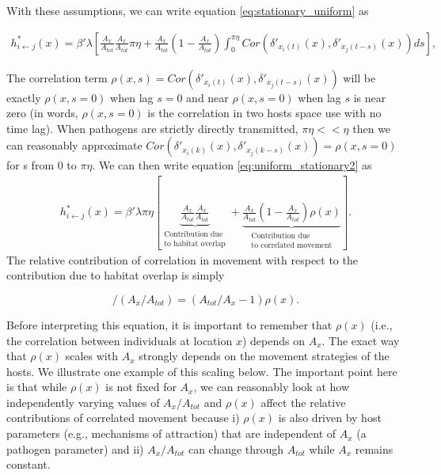 ﻿\documentclass[11pt]{article}
\begin{document}
With these assumptions, we can write equation \ref{eq:stationary_uniform} as

\begin{equation}
    \begin{aligned}
        h^*_{i \leftarrow j}(x) = \beta' \lambda \left[\frac{A_x}{A_{tot}}\frac{A_x}{A_{tot}} \pi \eta + \frac{A_x}{A_{tot}}\left(1 - \frac{A_x}{A_{tot}}\right) \int_{0}^{\pi \eta} Cor(\delta'_{x_i(t)}(x), \delta'_{x_j(t - s)}(x)) ds\right],
    \end{aligned}
    \label{eq:uniform_stationary2}
\end{equation}

The correlation term $\rho(x, s) = Cor(\delta'_{x_i(t)}(x), \delta'_{x_j(t - s)}(x))$ will be exactly $\rho(x, s = 0)$ when lag $s = 0$ and near $\rho(x, s = 0)$ when lag $s$ is near zero (in words, $\rho(x, s = 0)$ is the correlation in two hosts space use with no time lag).  When pathogens are strictly directly transmitted, $\pi \eta << \eta$ then we can reasonably approximate $Cor(\delta'_{x_i(k)}(x), \delta'_{x_j(k - s)}(x)) = \rho(x, s = 0)$ for s from 0 to $\pi \eta$.  We can then write equation \ref{eq:uniform_stationary2} as 
\begin{equation}
    \begin{aligned}
        h^*_{i \leftarrow j}(x) = \beta' \lambda \pi \eta \left[\underbrace{\frac{A_x}{A_{tot}}\frac{A_x}{A_{tot}}}_{\substack{\text{Contribution due} \\  \text{to habitat overlap}}} + \underbrace{\frac{A_x}{A_{tot}}(1 - \frac{A_x}{A_{tot}}) \rho(x)}_{\substack{\text{Contribution due} \\ \text{to correlated movement}}} \right].
    \end{aligned}
    \label{eq:uniform_direct}
\end{equation}
The relative contribution of correlation in movement with respect to the contribution due to habitat overlap is simply 


\begin{equation}
    [(1 - (A_x / A_{tot}))\rho(x)] / (A_x / A_{tot})=(A_{tot}/A_x-1)\rho(x). 
    \label{eq:analytical_relationship}
\end{equation}

Before interpreting this equation, it is important to remember that $\rho(x)$ (i.e., the correlation between individuals at location $x$) depends on $A_x$. The exact way that $\rho(x)$ scales with $A_x$ strongly depends on the movement strategies of the hosts. We illustrate one example of this scaling below. The important point here is that while $\rho(x)$ is not fixed for $A_x$, we can reasonably look at how independently varying values of $A_x / A_{tot}$ and $\rho(x)$ affect the relative contributions of correlated movement because i) $\rho(x)$ is also driven by host parameters (e.g., mechanisms of attraction) that are independent of $A_x$ (a pathogen parameter) and ii) $A_x / A_{tot}$ can change through $A_{tot}$ while $A_{x}$ remains constant.
\end{document}
